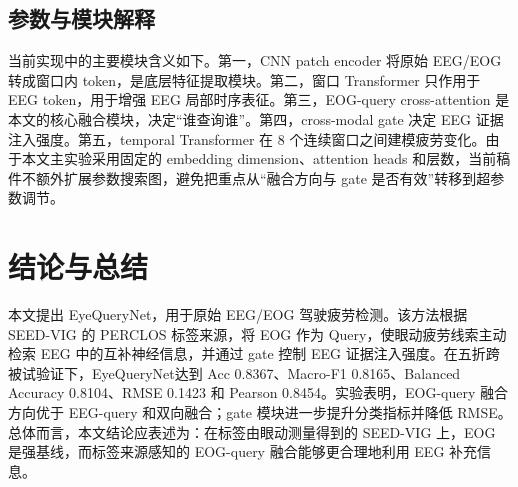 \documentclass[UTF8,a4paper,10pt,fontset=windows]{ctexart}
\newcommand{\method}{EyeQueryNet}
\begin{document}
\begin{table}[H]
\centering
\small
\caption{模块消融结果。Full model 表示本文主模型；w/o 表示移除对应模块。Acc、F1 和 BalAcc 越高越好；RMSE 越低越好。}
\label{tab:ablation}
\end{table}

\subsection{参数与模块解释}
当前实现中的主要模块含义如下。第一，CNN patch encoder 将原始 EEG/EOG 转成窗口内 token，是底层特征提取模块。第二，窗口 Transformer 只作用于 EEG token，用于增强 EEG 局部时序表征。第三，EOG-query cross-attention 是本文的核心融合模块，决定“谁查询谁”。第四，cross-modal gate 决定 EEG 证据注入强度。第五，temporal Transformer 在 8 个连续窗口之间建模疲劳变化。由于本文主实验采用固定的 embedding dimension、attention heads 和层数，当前稿件不额外扩展参数搜索图，避免把重点从“融合方向与 gate 是否有效”转移到超参数调节。

\section{结论与总结}

本文提出 \method，用于原始 EEG/EOG 驾驶疲劳检测。该方法根据 SEED-VIG 的 PERCLOS 标签来源，将 EOG 作为 Query，使眼动疲劳线索主动检索 EEG 中的互补神经信息，并通过 gate 控制 EEG 证据注入强度。在五折跨被试验证下，\method 达到 Acc 0.8367、Macro-F1 0.8165、Balanced Accuracy 0.8104、RMSE 0.1423 和 Pearson 0.8454。实验表明，EOG-query 融合方向优于 EEG-query 和双向融合；gate 模块进一步提升分类指标并降低 RMSE。总体而言，本文结论应表述为：在标签由眼动测量得到的 SEED-VIG 上，EOG 是强基线，而标签来源感知的 EOG-query 融合能够更合理地利用 EEG 补充信息。
\end{document}
